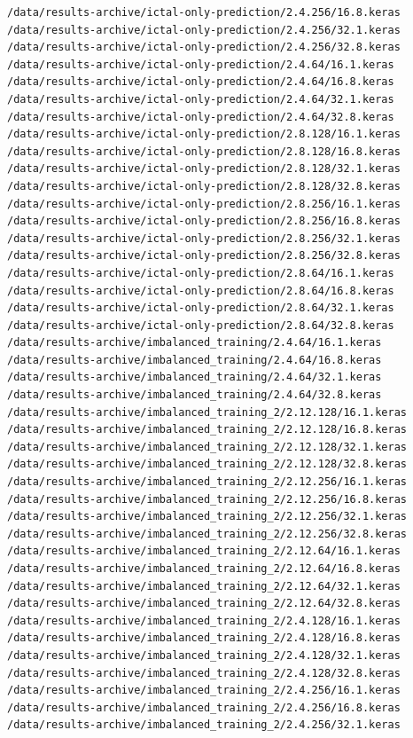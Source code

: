 \documentclass[12pt]{article}
\begin{document}
\begin{lstlisting}[style=logstyle, caption={List of failed trained models. See \ref{issues}}, label={lst:model-list}]
/data/results-archive/ictal-only-prediction/2.4.256/16.8.keras
/data/results-archive/ictal-only-prediction/2.4.256/32.1.keras
/data/results-archive/ictal-only-prediction/2.4.256/32.8.keras
/data/results-archive/ictal-only-prediction/2.4.64/16.1.keras
/data/results-archive/ictal-only-prediction/2.4.64/16.8.keras
/data/results-archive/ictal-only-prediction/2.4.64/32.1.keras
/data/results-archive/ictal-only-prediction/2.4.64/32.8.keras
/data/results-archive/ictal-only-prediction/2.8.128/16.1.keras
/data/results-archive/ictal-only-prediction/2.8.128/16.8.keras
/data/results-archive/ictal-only-prediction/2.8.128/32.1.keras
/data/results-archive/ictal-only-prediction/2.8.128/32.8.keras
/data/results-archive/ictal-only-prediction/2.8.256/16.1.keras
/data/results-archive/ictal-only-prediction/2.8.256/16.8.keras
/data/results-archive/ictal-only-prediction/2.8.256/32.1.keras
/data/results-archive/ictal-only-prediction/2.8.256/32.8.keras
/data/results-archive/ictal-only-prediction/2.8.64/16.1.keras
/data/results-archive/ictal-only-prediction/2.8.64/16.8.keras
/data/results-archive/ictal-only-prediction/2.8.64/32.1.keras
/data/results-archive/ictal-only-prediction/2.8.64/32.8.keras
/data/results-archive/imbalanced_training/2.4.64/16.1.keras
/data/results-archive/imbalanced_training/2.4.64/16.8.keras
/data/results-archive/imbalanced_training/2.4.64/32.1.keras
/data/results-archive/imbalanced_training/2.4.64/32.8.keras
/data/results-archive/imbalanced_training_2/2.12.128/16.1.keras
/data/results-archive/imbalanced_training_2/2.12.128/16.8.keras
/data/results-archive/imbalanced_training_2/2.12.128/32.1.keras
/data/results-archive/imbalanced_training_2/2.12.128/32.8.keras
/data/results-archive/imbalanced_training_2/2.12.256/16.1.keras
/data/results-archive/imbalanced_training_2/2.12.256/16.8.keras
/data/results-archive/imbalanced_training_2/2.12.256/32.1.keras
/data/results-archive/imbalanced_training_2/2.12.256/32.8.keras
/data/results-archive/imbalanced_training_2/2.12.64/16.1.keras
/data/results-archive/imbalanced_training_2/2.12.64/16.8.keras
/data/results-archive/imbalanced_training_2/2.12.64/32.1.keras
/data/results-archive/imbalanced_training_2/2.12.64/32.8.keras
/data/results-archive/imbalanced_training_2/2.4.128/16.1.keras
/data/results-archive/imbalanced_training_2/2.4.128/16.8.keras
/data/results-archive/imbalanced_training_2/2.4.128/32.1.keras
/data/results-archive/imbalanced_training_2/2.4.128/32.8.keras
/data/results-archive/imbalanced_training_2/2.4.256/16.1.keras
/data/results-archive/imbalanced_training_2/2.4.256/16.8.keras
/data/results-archive/imbalanced_training_2/2.4.256/32.1.keras

\end{lstlisting}
\end{document}
